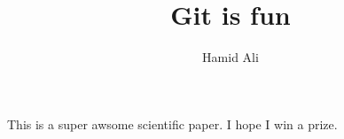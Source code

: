 \documentclass[10pt]{article}
\author{Hamid Ali}
\title{Git is fun}
\begin{document}
        \maketitle
        This is a super awsome scientific paper.
        I hope I win a prize.
\end{document}

